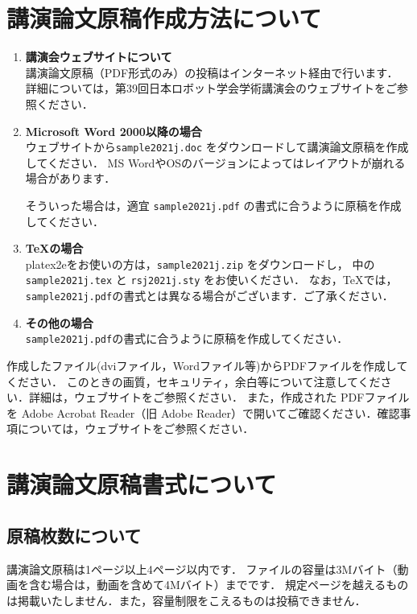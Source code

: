 \section{講演論文原稿作成方法について}
\begin{enumerate}
    \item {\bf 講演会ウェブサイトについて}\\
        講演論文原稿（PDF形式のみ）の投稿はインターネット経由で行います．
        詳細については，第39回日本ロボット学会学術講演会のウェブサイト\cite{website}をご参照ください．

    \item {\bf Microsoft Word 2000以降の場合}\\
    ウェブサイト\cite{website}から\verb|sample2021j.doc| をダウンロードして講演論文原稿を作成してください．
	MS WordやOSのバージョンによってはレイアウトが崩れる場合があります．
	
	そういった場合は，適宜 \verb|sample2021j.pdf| の書式に合うように原稿を作成してください．

    \item {\bf \TeX の場合}\\
        platex2eをお使いの方は，\verb|sample2021j.zip| をダウンロードし，
          中の \verb|sample2021j.tex| と \verb|rsj2021j.sty| をお使いください．
        なお，\TeX では，\verb|sample2021j.pdf|の書式とは異なる場合がございます．ご了承ください．

    \item {\bf その他の場合}\\        
        \verb|sample2021j.pdf|の書式に合うように原稿を作成してください．
\end{enumerate}

作成したファイル(dviファイル，Wordファイル等)からPDFファイルを作成してください．
このときの画質，セキュリティ，余白等について注意してください．詳細は，ウェブサイト\cite{website}をご参照ください．
また，作成された PDFファイルを Adobe Acrobat Reader（旧 Adobe Reader）で開いてご確認ください．確認事項については，ウェブサイト\cite{website}をご参照ください．

\section{講演論文原稿書式について}
\subsection{原稿枚数について}
講演論文原稿は1ページ以上4ページ以内です．
ファイルの容量は3Mバイト（動画を含む場合は，動画を含めて4Mバイト）までです．
規定ページを越えるものは掲載いたしません．また，容量制限をこえるものは投稿できません．


